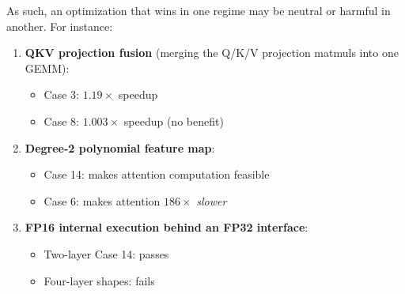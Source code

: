 \documentclass[10pt,conference,compsoc]{IEEEtran}
\begin{document}
As such, an optimization that wins in one regime may be neutral or harmful in another. For instance:

\begin{enumerate}
    \item \textbf{QKV projection fusion} (merging the Q/K/V projection matmuls into one GEMM):
    \begin{itemize}
        \item Case 3: $1.19\times$ speedup
        \item Case 8: $1.003\times$ speedup (no benefit)
    \end{itemize}
    \item \textbf{Degree-2 polynomial feature map}:
    \begin{itemize}
        \item Case 14: makes attention computation feasible
        \item Case 6: makes attention $186\times$ \emph{slower}
    \end{itemize}
    \item \textbf{FP16 internal execution behind an FP32 interface}:
    \begin{itemize}
        \item Two-layer Case 14: passes
        \item Four-layer shapes: fails
    \end{itemize}
\end{enumerate}
\end{document}
